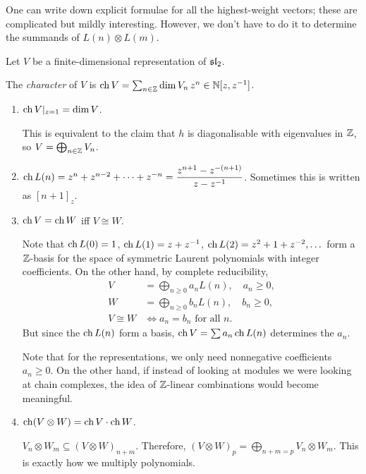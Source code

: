 One can write down explicit formulae for all the highest-weight vectors; these
are complicated but mildly interesting. However, we don't have to do it to
determine the summands of $L(n) \otimes L(m)$.

Let $V$ be a finite-dimensional representation of $\sl_2$.

\begin{definition}
The \emph{character} of $V$ is
$\ch V = \sum_{n \in \Z} \dim V_n\, z^n \in \N[z, z^{-1}]$.
\end{definition}

\begin{properties}\leavevmode
\begin{enumerate}
  \item $\ch V|_{z=1} = \dim V$.

    This is equivalent to the claim that $h$ is diagonalisable with
    eigenvalues in $\Z$, so $V = \bigoplus_{n \in \Z} V_n$.
  \item $\ch L(n) = z^n + z^{n-2} + \dots + z^{-n}
       = \dfrac{z^{n+1} - z^{-(n+1)}}{z - z^{-1}}$.
    Sometimes this is written as $[n + 1]_z$.
  \item $\ch V = \ch W$ iff $V \cong W$.

    Note that $\ch L(0) = 1$, $\ch L(1) = z + z^{-1}$,
    $\ch L(2) = z^2 + 1 + z^{-2}, \dots$ form a $\Z$-basis for the space of
    symmetric Laurent polynomials with integer coefficients. On the other
    hand, by complete reducibility,
    \begin{align*}
      V &= \textstyle\bigoplus_{n \geq 0} a_nL(n), \quad a_n \geq 0,\\
      W &= \textstyle\bigoplus_{n \geq 0} b_nL(n), \quad b_n \geq 0,\\
      V \cong W &\iff a_n = b_n \text{ for all } n.
    \end{align*}
    But since the $\ch L(n)$ form a basis, $\ch V = \sum a_n \ch L(n)$
    determines the $a_n$.

    \begin{remark}
    Note that for the representations, we only need nonnegative coefficients
    $a_n \geq 0$. On the other hand, if instead of looking at modules we were
    looking at chain complexes, the idea of $\Z$-linear combinations would
    become meaningful.
    \end{remark}
  \item $\ch(V \otimes W) = \ch V \cdot \ch W$.

    \begin{exercise}[Essential!]
    $V_n \otimes W_m \subseteq (V \otimes W)_{n+m}$. Therefore,
    $(V \otimes W)_p = \bigoplus_{n+m=p} V_n \otimes W_m$. This is exactly how
    we multiply polynomials.
    \end{exercise}


\end{enumerate}
\end{properties}

